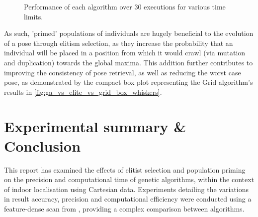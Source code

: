 \documentclass[authoryearcitations]{UoYCSproject}
\begin{document}
\begin{figure}
	\caption[Grid, Elitism, Benchmark time-adjusted performance.]{Performance of each algorithm over 30 executions for various time limits.}
	\label{fig:ga_vs_elite_vs_grid_box_whiskers}
\end{figure}

As such, 'primed' populations of individuals are hugely beneficial to the evolution of a pose through elitism selection, as they increase the probability that an individual will be placed in a position from which it would crawl (via mutation and duplication) towards the global maxima. This addition further contributes to improving the consistency of pose retrieval, as well as reducing the worst case pose, as demonstrated by the compact box plot representing the Grid algorithm's results in \autoref{fig:ga_vs_elite_vs_grid_box_whiskers}.





\chapter{Experimental summary \& Conclusion}
This report has examined the effects of elitist selection and population priming on the precision and computational time of genetic algorithms, within the context of indoor localisation using Cartesian data. Experiments detailing the variations in result accuracy, precision and computational efficiency were conducted using a feature-dense scan from \citet{Lenac2011-co}, providing a complex comparison between algorithms.
\end{document}
